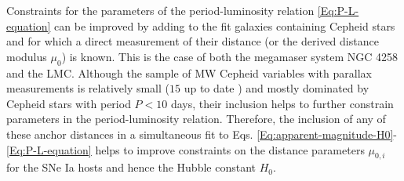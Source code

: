 Constraints for the parameters of the period-luminosity relation \eqref{Eq:P-L-equation} can be improved by adding to the fit galaxies containing Cepheid stars and for which a direct measurement of their distance (or the derived distance modulus $\mu_0$) is known. This is the case of both the megamaser system NGC 4258 and the LMC. Although the sample of MW Cepheid variables with parallax measurements is relatively small ($15$ up to date \cite{Riess:2016jrr}) and mostly dominated by Cepheid stars with period $P<10$ days, their inclusion helps to further constrain parameters in the period-luminosity relation. Therefore, the inclusion of any of these anchor distances in a simultaneous fit to Eqs. \eqref{Eq:apparent-magnitude-H0}-\eqref{Eq:P-L-equation} helps to improve constraints on the distance parameters $\mu_{0,i}$ for the SNe Ia hosts and hence the Hubble constant $H_0$. 

 


